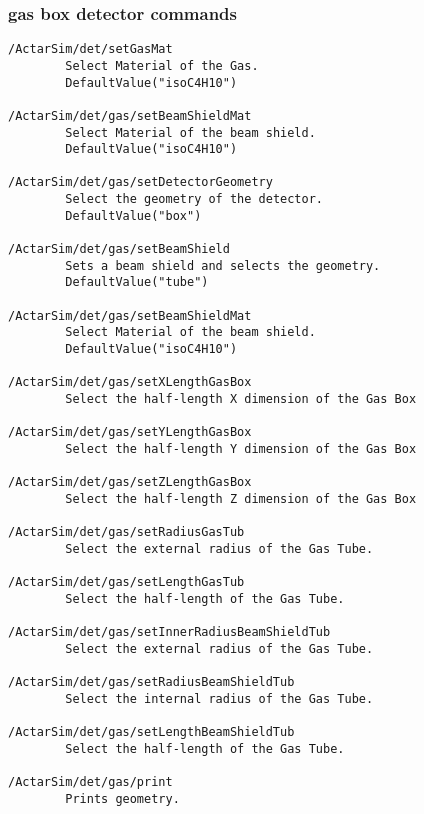\subsubsection{gas box detector commands}
\begin{verbatim}
/ActarSim/det/setGasMat
        Select Material of the Gas.
        DefaultValue("isoC4H10")

/ActarSim/det/gas/setBeamShieldMat
        Select Material of the beam shield.
        DefaultValue("isoC4H10")

/ActarSim/det/gas/setDetectorGeometry
        Select the geometry of the detector.
        DefaultValue("box")

/ActarSim/det/gas/setBeamShield
        Sets a beam shield and selects the geometry.
        DefaultValue("tube")

/ActarSim/det/gas/setBeamShieldMat
        Select Material of the beam shield.
        DefaultValue("isoC4H10")

/ActarSim/det/gas/setXLengthGasBox
        Select the half-length X dimension of the Gas Box

/ActarSim/det/gas/setYLengthGasBox
        Select the half-length Y dimension of the Gas Box

/ActarSim/det/gas/setZLengthGasBox
        Select the half-length Z dimension of the Gas Box

/ActarSim/det/gas/setRadiusGasTub
        Select the external radius of the Gas Tube.

/ActarSim/det/gas/setLengthGasTub
        Select the half-length of the Gas Tube.

/ActarSim/det/gas/setInnerRadiusBeamShieldTub
        Select the external radius of the Gas Tube.

/ActarSim/det/gas/setRadiusBeamShieldTub
        Select the internal radius of the Gas Tube.

/ActarSim/det/gas/setLengthBeamShieldTub
        Select the half-length of the Gas Tube.

/ActarSim/det/gas/print
        Prints geometry.
\end{verbatim}

